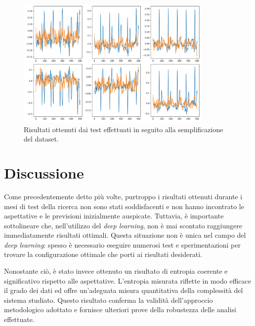 \documentclass[12pt,italian]{report}
\begin{document}
	\begin{figure}[H]
		\centering
		\includegraphics[width=0.85\textwidth]{immagini/seconda_cnn_risultati_secondo_plot_1.png}
		\captionsetup{justification=centering}
		\caption{Risultati ottenuti dai test effettuati in seguito alla semplificazione del dataset.}
		\label{fig:seconda_cnn_risultati_secondo_plot_1}
	\end{figure}
	
	
	\section{Discussione}
	\label{sec:discussione}
	
	Come precedentemente detto più volte, purtroppo i risultati ottenuti durante i mesi di test della ricerca non sono stati soddisfacenti e non hanno incontrato le aspettative e le previsioni inizialmente auspicate. Tuttavia, è importante sottolineare che, nell'utilizzo del \textit{deep learning}, non è mai scontato raggiungere immediatamente risultati ottimali. Questa situazione non è unica nel campo del \textit{deep learning}: spesso è necessario eseguire numerosi test e sperimentazioni per trovare la configurazione ottimale che porti ai risultati desiderati.
	
	Nonostante ciò, è stato invece ottenuto un risultato di entropia coerente e significativo rispetto alle aspettative. L'entropia misurata riflette in modo efficace il grado dei dati ed offre un'adeguata misura quantitativa della complessità del sistema studiato. Questo risultato conferma la validità dell'approccio metodologico adottato e fornisce ulteriori prove della robustezza delle analisi effettuate.
	
\end{document}
